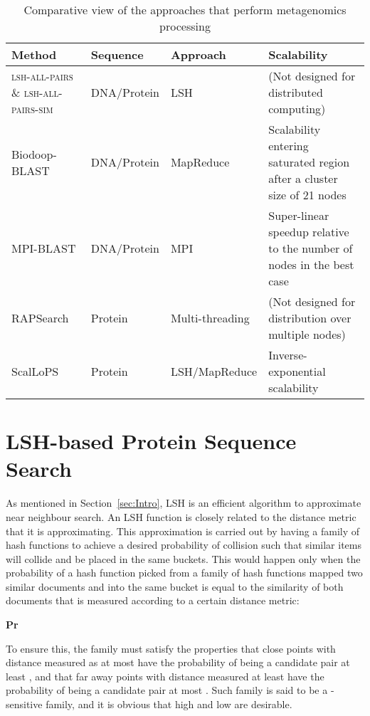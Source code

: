 \documentclass[titlepage]{csetr}
\begin{document}
\begin{table} [!ht]
\centering
\caption{Comparative view of the approaches that perform metagenomics processing
\label{tbl:RelatedWorks}}
\begin{tabular} { |p{}| p{}|p{}|p{}|}
\hline
Method & Sequence & Approach & Scalability\\
\hline
 \textsc{lsh-all-pairs} \cite{SequenceComparisonLSH} \& \textsc{lsh-all-pairs-sim} \cite{LSH-ALL-PAIRS-SIM, LSH-ALL-PAIRS-SIM2} & DNA/Protein & LSH & (Not designed for distributed computing)\\
\hline
Biodoop-BLAST \cite{Biodoop} & DNA/Protein & MapReduce & Scalability entering saturated region after a cluster size of 21 nodes\\
\hline
MPI-BLAST \cite{MPIBLAST} & DNA/Protein & MPI & Super-linear speedup relative to the number of nodes in the best case \\
\hline
RAPSearch \cite{RAPSearch} \cite{RAPSearch2} & Protein & Multi-threading & (Not designed for distribution over multiple nodes)\\
\hline
ScalLoPS & Protein & LSH/Map\-Reduce & Inverse-exponential scalability\\
\hline
\end{tabular}
\end{table}

\section{LSH-based Protein Sequence Search}
\label{sec:LSH}

As mentioned in Section~\ref{sec:Intro}, LSH is an efficient algorithm to approximate near neighbour search. An LSH function is closely related to the distance metric that it is approximating.  This approximation is carried out by having a family of hash functions to achieve a desired probability of collision such that similar items will collide and be placed in the same buckets. This would happen only when the probability of a hash function  picked from a family of hash functions  mapped two similar documents  and  into the same bucket is equal to the similarity of both documents that is measured according to a certain distance metric:

\textbf{Pr}

To ensure this, the family must satisfy the properties that close points with distance measured as at most  have the probability of being a candidate pair at least , and that far away points with distance measured at least  have the probability of being a candidate pair at most . Such family is said to be a -sensitive family, and it is obvious that high  and low  are desirable.
\end{document}
